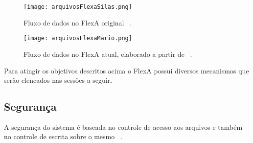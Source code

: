 	 \begin{figure}[!ht]
	 \centering
	 \texttt{[image: arquivosFlexaSilas.png]}
	 \caption{Fluxo de dados no FlexA original ~\cite{silas}.}
	 \label{fig:arquivosSilas}
	 \end{figure}
	 
	 \begin{figure}[!ht]
	 \centering
	 \texttt{[image: arquivosFlexaMario.png]}
	 \caption{Fluxo de dados no FlexA atual, elaborado a partir de ~\cite{mario}.}
	 \label{fig:arquivosMario}
	 \end{figure}
	 
	 
	 Para atingir os objetivos descritos acima o FlexA possui diversos mecanismos que serão elencados nas sessões a seguir.
	 
	 \subsection{Segurança}
	    A segurança do sistema é baseada no controle de acesso aos arquivos e também no controle de escrita sobre o mesmo ~\cite{silas}.
	 
